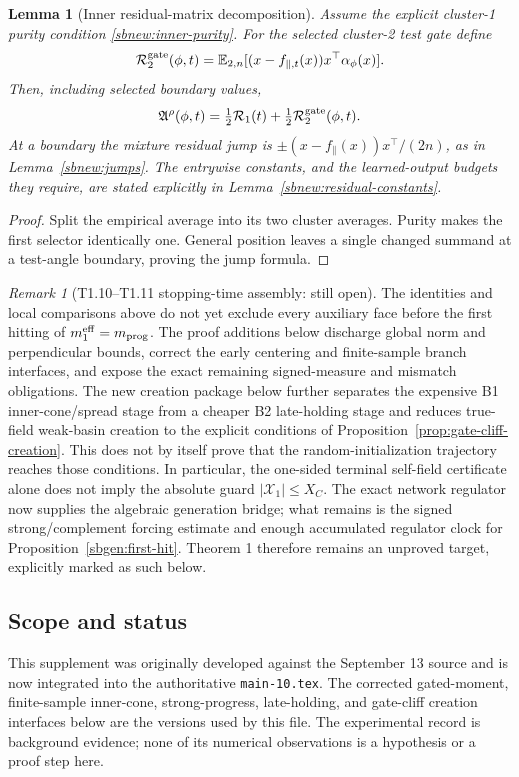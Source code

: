 \documentclass{article} %
\theoremstyle{plain}
\newtheorem{lemma}[theorem]{Lemma}
\theoremstyle{definition}
\theoremstyle{remark}
\newtheorem{remark}[theorem]{Remark}
\begin{document}
\begin{lemma}[Inner residual-matrix decomposition]
\label{lem:inner-residual-decomposition}
Assume the explicit cluster-1 purity condition
\eqref{sbnew:inner-purity}. For the selected cluster-2 test gate define
\[
\mathcal R_2^{\rm gate}(\phi,t)
=\mathbb E_{2,n}[(x-f_{\parallel,t}(x))x^\top\alpha_\phi(x)].
\]
Then, including selected boundary values,
\[
\mathfrak A^\rho(\phi,t)
=\tfrac12\mathcal R_1(t)+\tfrac12\mathcal R_2^{\rm gate}(\phi,t).
\]
At a boundary the mixture residual jump is
$\pm(x-f_\parallel(x))x^\top/(2n)$, as in
Lemma~\ref{sbnew:jumps}. The entrywise constants, and the learned-output
budgets they require, are stated explicitly in
Lemma~\ref{sbnew:residual-constants}.
\end{lemma}
\begin{proof}
Split the empirical average into its two cluster averages. Purity makes
the first selector identically one. General position leaves a single
changed summand at a test-angle boundary, proving the jump formula.
\end{proof}

\begin{remark}[T1.10--T1.11 stopping-time assembly: still open]
\label{rem:T110-assembly}
The identities and local comparisons above do not yet exclude every
auxiliary face before the first hitting of $m_1^{\rm eff}=m_{\rm prog}$.
The proof additions below discharge global norm and perpendicular bounds,
correct the early centering and finite-sample branch interfaces, and expose
the exact remaining signed-measure and mismatch obligations.  The new
creation package below further separates the expensive B1 inner-cone/spread
stage from a cheaper B2 late-holding stage and reduces true-field weak-basin
creation to the explicit conditions of
Proposition~\ref{prop:gate-cliff-creation}.  This does not by itself prove
that the random-initialization trajectory reaches those conditions.
In particular, the one-sided terminal self-field certificate alone does not
imply the absolute guard $|\mathcal X_1|\le X_C$.  The exact network
regulator now supplies the algebraic generation bridge; what remains is the
signed strong/complement forcing estimate and enough accumulated regulator
clock for Proposition~\ref{sbgen:first-hit}.  Theorem 1 therefore remains an
unproved target, explicitly marked as such below.
\end{remark}


\subsection{Scope and status}
This supplement was originally developed against the September 13 source and
is now integrated into the authoritative \texttt{main-10.tex}.  The corrected
gated-moment, finite-sample inner-cone, strong-progress, late-holding, and
gate-cliff creation interfaces below are the versions used by this file.
The experimental record is background evidence; none of its numerical
observations is a hypothesis or a proof step here.
\end{document}
